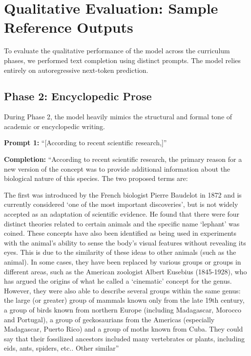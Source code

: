 \documentclass[12pt]{article}
\begin{document}
\section{Qualitative Evaluation: Sample Reference Outputs}
To evaluate the qualitative performance of the model across the curriculum phases, we performed text completion using distinct prompts. The model relies entirely on autoregressive next-token prediction.

\subsection{Phase 2: Encyclopedic Prose}
During Phase 2, the model heavily mimics the structural and formal tone of academic or encyclopedic writing.

\begin{mdframed}[backgroundcolor=gray!10, roundcorner=5pt]
\raggedright %
\textbf{Prompt 1:} ``[According to recent scientific research,]''

\textbf{Completion:} ``According to recent scientific research, the primary reason for a new version of the concept was to provide additional information about the biological nature of this species. The two proposed terms are: 

The first was introduced by the French biologist Pierre Baudelot in 1872 and is currently considered `one of the most important discoveries', but is not widely accepted as an adaptation of scientific evidence. He found that there were four distinct theories related to certain animals and the specific name `lephant' was coined. These concepts have also been identified as being used in experiments with the animal's ability to sense the body's visual features without revealing its eyes. This is due to the similarity of these ideas to other animals (such as the animal). In some cases, they have been replaced by various groups or groups in different areas, such as the American zoologist Albert Eusebius (1845-1928), who has argued the origins of what he called a `cinematic' concept for the genus. However, they were also able to describe several groups within the same genus: the large (or greater) group of mammals known only from the late 19th century, a group of birds known from northern Europe (including Madagascar, Morocco and Portugal), a group of geckosaurians from the Americas (especially Madagascar, Puerto Rico) and a group of moths known from Cuba. They could say that their fossilized ancestors included many vertebrates or plants, including eids, ants, spiders, etc.. Other similar''
\end{mdframed}
\end{document}
